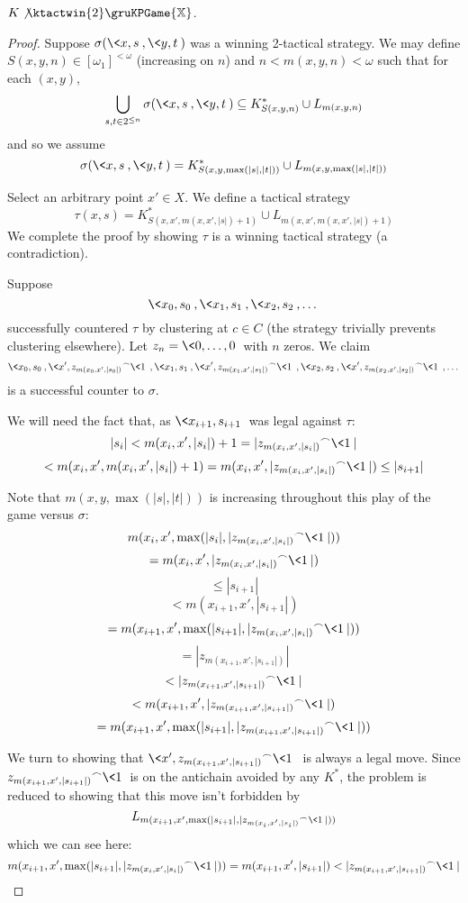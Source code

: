\begin{thm}
$K\not\ktactwin{2}\gruKPGame{\mathbb{X}}$.
\end{thm}

\begin{proof}
Suppose $\sigma(\<x,s\>,\<y,t\>)$ was a winning 2-tactical strategy. We may define $S(x,y,n)\in [\omega_1]^{<\omega}$ (increasing on $n$) and $n<m(x,y,n)<\omega$ such that for each $(x,y)$,
  \[
    \bigcup_{s,t \in 2^{\leq n}} \sigma(\<x,s\>,\<y,t\>) \subseteq
    K^*_{S(x,y,n)} \cup L_{m(x,y,n)}
  \]
and so we assume
  \[
    \sigma(\<x,s\>,\<y,t\>) =
    K^*_{S(x,y,\max(|s|,|t|))} \cup L_{m(x,y,\max(|s|,|t|))}
  \]

Select an arbitrary point $x' \in X$. We define a tactical strategy
  \[
  \tau(x,s) =
  K^*_{S(x,x',m(x,x',|s|)+1)} \cup L_{m(x,x',m(x,x',|s|)+1)}
  \]
We complete the proof by showing $\tau$ is a winning tactical strategy (a contradiction).

Suppose
\[
\<x_0, s_0\>, \<x_1, s_1\>, \<x_2, s_2\>, \dots
\]
successfully countered $\tau$ by clustering at $c\in C$ (the strategy trivially prevents clustering elsewhere). Let $z_n = \<0,\dots,0\>$ with $n$ zeros. We claim
\[
\<x_0, s_0\>, \<x', {z_{m(x_0,x',|s_0|)}}^\frown\<1\>\>, \<x_1, s_1\>, \<x', {z_{m(x_1,x',|s_1|)}}^\frown\<1\>\>,  \<x_2, s_2\>, \<x', {z_{m(x_2,x',|s_2|)}}^\frown\<1\>\>, \dots
\]
is a successful counter to $\sigma$.

We will need the fact that, as $\<x_{i+1},s_{i+1}\>$ was legal against $\tau$:
  \[
    |s_i| <
    m(x_i,x',|s_i|)+1 =
    |{z_{m(x_i,x',|s_i|)}}^\frown\<1\>|
  \]
  \[
    <
    m(x_i,x',m(x_i,x',|s_i|)+1) =
    m(x_i,x',|{z_{m(x_i,x',|s_i|)}}^\frown\<1\>|) \leq
    |s_{i+1}|
  \]

Note that $m(x,y,\max(|s|,|t|))$ is increasing throughout this play of the game versus $\sigma$:
  \[
    m(x_i,x',\max(|s_i|,|{z_{m(x_i,x',|s_i|)}}^\frown\<1\>|))
  \]
  \[
    =
    m(x_i,x',|{z_{m(x_i,x',|s_i|)}}^\frown\<1\>|)
  \]
  \[
    \leq
    |s_{i+1}|
  \]
  \[
    <
    m(x_{i+1},x',|s_{i+1}|)
  \]
  \[
    =
    m(x_{i+1},x',\max(|s_{i+1}|,|{z_{m(x_i,x',|s_i|)}}^\frown\<1\>|))
  \]
  \[
    =
    |{z_{m(x_{i+1},x',|s_{i+1}|)}}|
  \]
  \[
    <
    |{z_{m(x_{i+1},x',|s_{i+1}|)}}^\frown\<1\>|
  \]
  \[
    <
    m(x_{i+1},x',|{z_{m(x_{i+1},x',|s_{i+1}|)}}^\frown\<1\>|)
  \]
  \[
    =
    m(x_{i+1},x',\max(|s_{i+1}|,|{z_{m(x_{i+1},x',|s_{i+1}|)}}^\frown\<1\>|))
  \]

We turn to showing that $\<x', {z_{m(x_{i+1},x',|s_{i+1}|)}}^\frown\<1\>\>$ is always a legal move. Since ${z_{m(x_{i+1},x',|s_{i+1}|)}}^\frown\<1\>$ is on the antichain avoided by any $K^*$, the problem is reduced to showing that this move isn't forbidden by
  \[
  L_{m(x_{i+1},x',\max(|s_{i+1}|,|{z_{m(x_i,x',|s_i|)}}^\frown\<1\>|))}
  \]
which we can see here:
  \[
    m(x_{i+1},x',\max(|s_{i+1}|,|{z_{m(x_i,x',|s_i|)}}^\frown\<1\>|)) =
    m(x_{i+1},x',|s_{i+1}|) <
    |{z_{m(x_{i+1},x',|s_{i+1}|)}}^\frown\<1\>|
  \]


\end{proof}
